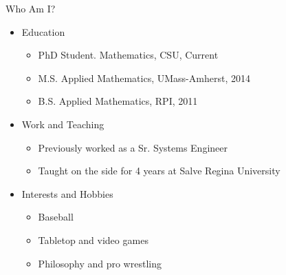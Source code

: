 {}\documentclass[letterpaper,
compress,
xcolor=x11names,
]{beamer}
\begin{document}
\begin{frame}{Who Am I?}
	\begin{itemize}
		\item Education
		\begin{itemize}
			\item PhD Student. Mathematics, CSU, Current
			\item M.S. Applied Mathematics, UMass-Amherst, 2014
			\item B.S. Applied Mathematics, RPI, 2011
		\end{itemize}
		\item Work and Teaching
		\begin{itemize}
			\item Previously worked as a Sr. Systems Engineer
			\item Taught on the side for 4 years at Salve Regina University
		\end{itemize}
		\item<2-> Interests and Hobbies
		\begin{itemize}
			\item Baseball
			\item Tabletop and video games
			\item Philosophy and pro wrestling
		\end{itemize}
	\end{itemize}
	\begin{center}
	\end{center}
\end{frame}
\end{document}
